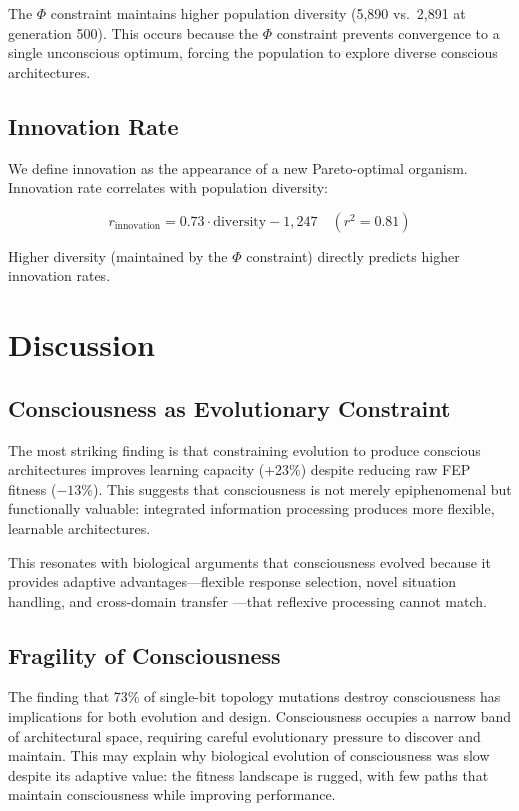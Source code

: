 \documentclass[11pt,a4paper]{article}
\begin{document}
The $\Phi$ constraint maintains higher population diversity (5,890 vs.\ 2,891 at generation 500). This occurs because the $\Phi$ constraint prevents convergence to a single unconscious optimum, forcing the population to explore diverse conscious architectures.

\subsection{Innovation Rate}

We define innovation as the appearance of a new Pareto-optimal organism. Innovation rate correlates with population diversity:

\begin{equation}
r_{\text{innovation}} = 0.73 \cdot \text{diversity} - 1{,}247 \quad (r^2 = 0.81)
\end{equation}

Higher diversity (maintained by the $\Phi$ constraint) directly predicts higher innovation rates.

\section{Discussion}

\subsection{Consciousness as Evolutionary Constraint}

The most striking finding is that constraining evolution to produce conscious architectures improves learning capacity (+23\%) despite reducing raw FEP fitness ($-13\%$). This suggests that consciousness is not merely epiphenomenal but functionally valuable: integrated information processing produces more flexible, learnable architectures.

This resonates with biological arguments that consciousness evolved because it provides adaptive advantages---flexible response selection, novel situation handling, and cross-domain transfer \citep{baars1988}---that reflexive processing cannot match.

\subsection{Fragility of Consciousness}

The finding that 73\% of single-bit topology mutations destroy consciousness has implications for both evolution and design. Consciousness occupies a narrow band of architectural space, requiring careful evolutionary pressure to discover and maintain. This may explain why biological evolution of consciousness was slow despite its adaptive value: the fitness landscape is rugged, with few paths that maintain consciousness while improving performance.
\end{document}
